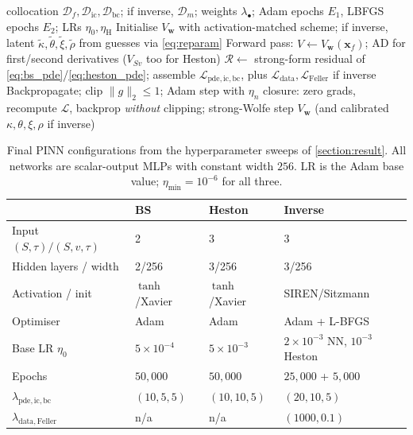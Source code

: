 \begin{algorithm}[htbp!]
\caption{PINN training: forward and (optionally) inverse}\label{alg:pinn}
\begin{algorithmic}[1]
\Require collocation $\mathcal{D}_f,\mathcal{D}_{\mathrm{ic}},\mathcal{D}_{\mathrm{bc}}$; if inverse, $\mathcal{D}_m$; weights $\lambda_\bullet$; Adam epochs $E_1$, LBFGS epochs $E_2$; LRs $\eta_0,\eta_{\mathrm{H}}$
\State Initialise $V_{\boldsymbol{w}}$ with activation-matched scheme; if inverse, latent $\tilde\kappa,\tilde\theta,\tilde\xi,\tilde\rho$ from guesses via \eqref{eq:reparam}
    \State Forward pass: $V\leftarrow V_{\boldsymbol{w}}(\mathbf{x}_f)$; AD for first/second derivatives ($V_{Sv}$ too for Heston)
    \State $\mathcal{R}\leftarrow$ strong-form residual of \eqref{eq:bs_pde}/\eqref{eq:heston_pde}; assemble $\mathcal{L}_{\mathrm{pde,ic,bc}}$, plus $\mathcal{L}_{\mathrm{data}},\mathcal{L}_{\mathrm{Feller}}$ if inverse
    \State Backpropagate; clip $\|g\|_2\le 1$; Adam step with $\eta_n$
\EndFor
{}
    \State closure: zero grads, recompute $\mathcal{L}$, backprop \emph{without} clipping; strong-Wolfe step
\EndFor
\State \Return $V_{\boldsymbol{w}}$ (and calibrated $\kappa,\theta,\xi,\rho$ if inverse)
\end{algorithmic}
\end{algorithm}

\begin{table}[!htbp]
    \centering
    \footnotesize
    \setlength{\tabcolsep}{3pt}
    \renewcommand{\arraystretch}{1.1}
    \caption{Final PINN configurations from the hyperparameter sweeps of \cref{section:result}. All networks are scalar-output MLPs with constant width $256$. LR is the Adam base value; $\eta_{\min}=10^{-6}$ for all three.}
    \label{tab:nn_architectures}
    \begin{tabularx}{\linewidth}{@{} l X X X @{}}
        \toprule
        & \textbf{BS} & \textbf{Heston} & \textbf{Inverse} \\
        \midrule
        Input $(S,\tau)/(S,v,\tau)$ & 2 & 3 & 3 \\
        Hidden layers / width      & 2/256 & 3/256 & 3/256 \\
        Activation / init          & $\tanh$/Xavier & $\tanh$/Xavier & SIREN/Sitzmann \\
        Optimiser                  & Adam & Adam & Adam + L-BFGS \\
        Base LR $\eta_0$           & $5\!\times\!10^{-4}$ & $5\!\times\!10^{-3}$ & $2\!\times\!10^{-3}$ NN, $10^{-3}$ Heston \\
        Epochs                     & $50{,}000$ & $50{,}000$ & $25{,}000$ + $5{,}000$ \\
        $\lambda_{\mathrm{pde,ic,bc}}$ & $(10,5,5)$ & $(10,10,5)$ & $(20,10,5)$ \\
        $\lambda_{\mathrm{data,Feller}}$ & n/a & n/a & $(1000,0.1)$ \\
        \bottomrule
    \end{tabularx}
\end{table}

